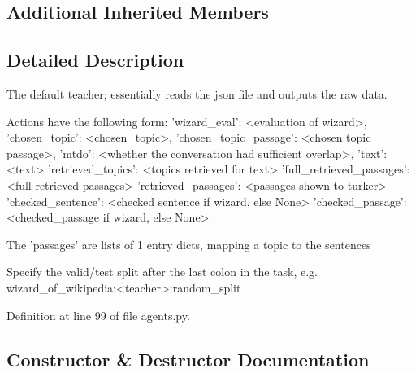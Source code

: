 \subsection*{Additional Inherited Members}


\subsection{Detailed Description}
\begin{DoxyVerb}The default teacher; essentially reads the json file and outputs the raw data.

Actions have the following form:
{
    'wizard_eval': <evaluation of wizard>,
    'chosen_topic': <chosen_topic>,
    'chosen_topic_passage': <chosen topic passage>,
    'mtdo': <whether the conversation had sufficient overlap>,
    'text': <text>
    'retrieved_topics': <topics retrieved for text>
    'full_retrieved_passages': <full retrieved passages>
    'retrieved_passages': <passages shown to turker>
    'checked_sentence': <checked sentence if wizard, else None>
    'checked_passage': <checked_passage if wizard, else None>
}

The 'passages' are lists of 1 entry dicts, mapping a topic to the sentences

Specify the valid/test split after the last colon in the task, e.g.
wizard_of_wikipedia:<teacher>:random_split
\end{DoxyVerb}
 

Definition at line 99 of file agents.\+py.



\subsection{Constructor \& Destructor Documentation}
\mbox{\label{classparlai_1_1tasks_1_1wizard__of__wikipedia_1_1agents_1_1WizardOfWikipediaTeacher_a364b2b8db4fd8162bd72d29fe4001d90}} 
